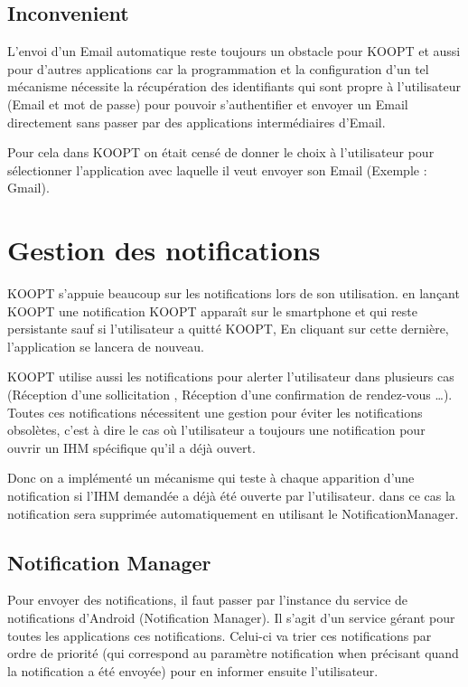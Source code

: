 \subsection{Inconvenient}
L’envoi d’un Email automatique reste toujours un obstacle pour KOOPT et aussi pour d’autres applications car la programmation et la configuration d’un tel mécanisme nécessite la récupération des identifiants qui sont propre à l’utilisateur (Email et mot de passe) pour pouvoir s’authentifier et envoyer un Email directement sans passer par des applications intermédiaires d'Email.

Pour cela dans KOOPT on était censé de donner le choix à l’utilisateur pour sélectionner l’application avec laquelle il veut envoyer son Email (Exemple : Gmail).


\section{Gestion des notifications }
KOOPT s’appuie beaucoup sur les notifications lors de son utilisation.
en lançant KOOPT une notification KOOPT apparaît sur le smartphone et qui reste persistante sauf si l’utilisateur a quitté KOOPT, En cliquant sur cette dernière, l’application se lancera de nouveau.

KOOPT utilise aussi les notifications pour alerter l’utilisateur dans plusieurs cas (Réception d’une sollicitation , Réception d’une confirmation de rendez-vous …). 
Toutes ces notifications nécessitent une gestion pour éviter les notifications obsolètes, c’est à dire le cas où l’utilisateur a toujours une notification pour ouvrir un IHM spécifique qu’il a déjà ouvert. 

Donc on a implémenté un mécanisme qui teste à chaque apparition d’une notification si l’IHM demandée a déjà été ouverte par l’utilisateur. dans ce cas la notification sera supprimée automatiquement en utilisant le NotificationManager.
\subsection{Notification Manager}
Pour envoyer des notifications, il faut passer par  l'instance du service de notifications d'Android (Notification Manager). Il s'agit d'un service gérant pour toutes les applications ces notifications. Celui-ci va trier ces notifications par ordre de priorité (qui correspond au paramètre notification when précisant quand la notification a été envoyée) pour en informer ensuite l'utilisateur.\cite{notification}
 
